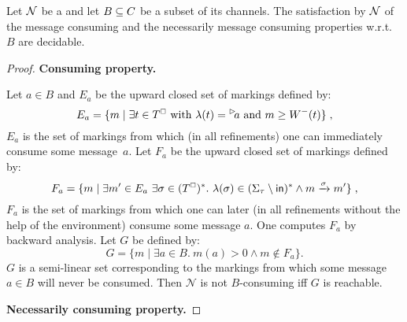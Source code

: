 \begin{proposition}
\label{prop:decide:consuming}
Let $\mathcal{N}$ be a \MAIOPN and let $B \subseteq C$ be a subset of its channels. 
The satisfaction by $\mathcal{N}$ of
the message consuming and the necessarily message consuming properties w.r.t.\ $B$
are decidable.
\end{proposition}
\begin{proof}
	{\bf Consuming property.} 

\noindent
Let $a \in B$ and $E_a$ be the upward closed set of markings defined by:
\[
	E_a=\{m\mid \exists t \in \Tmust \mbox{ with }\lambda(t)=\inact{a} \mbox{ and } m\geq W^-(t)\}\; ,
\]   
$E_a$ is the set of markings from which (in all refinements) one can immediately consume some message~$a$.
Let $F_a$ be the upward closed set of markings defined by:\\ 
\[
	F_a=\{m\mid \exists m'\in E_a\ \exists \sigma \in (T^{\scriptscriptstyle\square})^*.\ \lambda(\sigma) \in (\Sigma_\tau\setminus \mathsf{in})^* \wedge m \xrightarrow{\sigma} m'\}\;,
\]
$F_a$ is the set of markings from which one can later (in all refinements without the help of the environment)
consume some message $a$. One computes $F_a$ by backward analysis. Let $G$ be defined 
by: 
\[
	G=\{m \mid \exists a \in B. \ m(a)>0 \wedge m \notin F_a\}.
\]
$G$ is a semi-linear set corresponding to the markings
from which some message $a\in B$ will never be consumed. 
Then  $\mathcal N$ is not $B$-consuming
iff $G$ is reachable.


\smallskip\noindent
{\bf Necessarily consuming property.}


\end{proof}
